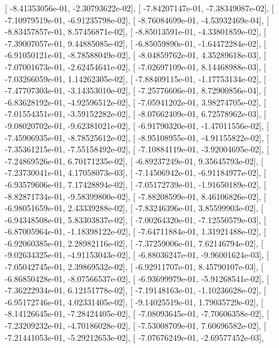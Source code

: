 \documentclass{article}
\begin{document}
       [ -8.41353056e-01,  -2.30793622e-02],
       [ -7.84207147e-01,  -7.38349087e-02],
       [ -7.10979519e-01,  -6.91235798e-02],
       [ -8.76084699e-01,  -4.53932469e-04],
       [ -8.83457857e-01,   8.57456871e-02],
       [ -8.85013591e-01,  -4.33801859e-02],
       [ -7.39007057e-01,   9.44885085e-02],
       [ -6.85059890e-01,  -1.64472284e-02],
       [ -6.91050121e-01,  -8.78588049e-02],
       [ -8.04859762e-01,   4.35289618e-03],
       [ -7.07001673e-01,  -2.62454641e-02],
       [ -7.02697109e-01,   8.14468988e-03],
       [ -7.03266059e-01,   1.14262305e-02],
       [ -7.88409115e-01,  -1.17753134e-02],
       [ -7.47707303e-01,  -3.14353010e-02],
       [ -7.25776606e-01,   8.72900856e-04],
       [ -6.83628192e-01,  -4.92596512e-02],
       [ -7.05941202e-01,   3.98274705e-02],
       [ -7.01554351e-01,  -3.59152282e-02],
       [ -8.07662409e-01,   6.72578962e-03],
       [ -9.08020702e-01,  -9.62381021e-02],
       [ -6.91790320e-01,  -1.47011556e-02],
       [ -7.45906935e-01,  -8.78525612e-02],
       [ -8.95108955e-01,  -4.91155822e-02],
       [ -7.35361215e-01,  -7.55158492e-02],
       [ -7.10884119e-01,  -3.92004695e-02],
       [ -7.24869526e-01,   6.70171235e-02],
       [ -6.89237249e-01,   9.35645793e-02],
       [ -7.23730041e-01,   4.17058073e-03],
       [ -7.14506942e-01,  -6.91184977e-02],
       [ -6.93579606e-01,   7.17428894e-02],
       [ -7.05172739e-01,  -1.91650189e-02],
       [ -8.82871734e-01,  -9.58399800e-02],
       [ -7.88208599e-01,   8.46106826e-02],
       [ -6.98051659e-01,   2.43339288e-02],
       [ -7.83246396e-01,   3.85599903e-02],
       [ -6.94348508e-01,   5.83303837e-02],
       [ -7.00264320e-01,  -7.12550579e-03],
       [ -6.87005964e-01,  -1.18398122e-02],
       [ -7.64711884e-01,   1.31921488e-02],
       [ -6.92060385e-01,   2.28982116e-02],
       [ -7.37259006e-01,   7.62146794e-02],
       [ -9.02634325e-01,  -4.91153043e-02],
       [ -6.88036247e-01,  -9.96001624e-03],
       [ -7.05042745e-01,   2.39869532e-02],
       [ -6.92911707e-01,   8.45790107e-03],
       [ -6.86850428e-01,  -8.07566537e-02],
       [ -6.93699979e-01,  -5.91268541e-02],
       [ -7.36222934e-01,   6.12151778e-02],
       [ -7.19148163e-01,  -1.10236628e-02],
       [ -6.95172746e-01,   4.02331405e-02],
       [ -9.14025519e-01,   1.79035729e-02],
       [ -8.14126645e-01,  -7.28424405e-02],
       [ -7.08093645e-01,  -7.70606358e-02],
       [ -7.23209232e-01,  -4.70186028e-02],
       [ -7.53008709e-01,   7.60696582e-02],
       [ -7.21441053e-01,  -5.29212653e-02],
       [ -7.07676249e-01,  -2.69577452e-03],
\end{document}
